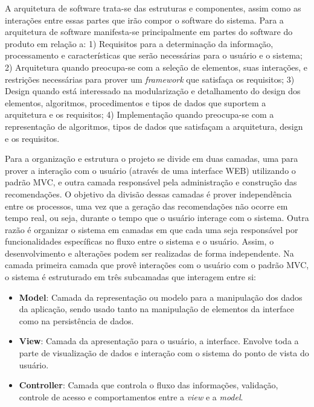 A arquitetura de software trata-se das estruturas e componentes, assim como as interações entre essas partes que irão compor o software do sistema. Para \cite{Perry1992} a arquitetura de software manifesta-se principalmente em partes do software do produto em relação a: 1) Requisitos para a determinação da informação, processamento e características que serão necessárias para o usuário e o sistema; 2) Arquitetura quando preocupa-se com a seleção de elementos, suas interações, e restrições necessárias para prover um \textit{framework} que satisfaça os requisitos; 3) Design quando está interessado na modularização e detalhamento do design dos elementos, algoritmos, procedimentos e tipos de dados que suportem a arquitetura e os requisitos; 4) Implementação quando preocupa-se com a representação de algoritmos, tipos de dados que satisfaçam a arquitetura, design e os requisitos.

Para a organização e estrutura o projeto se divide em duas camadas, uma para prover a interação com o usuário (através de uma interface WEB) utilizando o padrão \ac{MVC}, e outra camada responsável pela administração e construção das recomendações. O objetivo da divisão dessas camadas é prover independência entre os processos, uma vez que a geração das recomendações não ocorre em tempo real, ou seja, durante o tempo que o usuário interage com o sistema. Outra razão é organizar o sistema em camadas em que cada uma seja responsável por funcionalidades específicas no fluxo entre o sistema e o usuário. Assim, o desenvolvimento e alterações podem ser realizadas de forma independente. Na camada primeira camada que provê interações com o usuário com o padrão \ac{MVC}, o sistema é estruturado em três subcamadas que interagem entre si:

\begin{itemize}
	\item{\textbf{Model}: Camada da representação ou modelo para a manipulação dos dados da aplicação, sendo usado tanto na manipulação de elementos da interface como na persistência de dados.}
	
	\item{\textbf{View}: Camada da apresentação para o usuário, a interface. Envolve toda a parte de visualização de dados e interação com o sistema do ponto de vista do usuário.}
	
	\item{\textbf{Controller}: Camada que controla o fluxo das informações, validação, controle de acesso e comportamentos entre a \textit{view} e a \textit{model}.}
\end{itemize}

